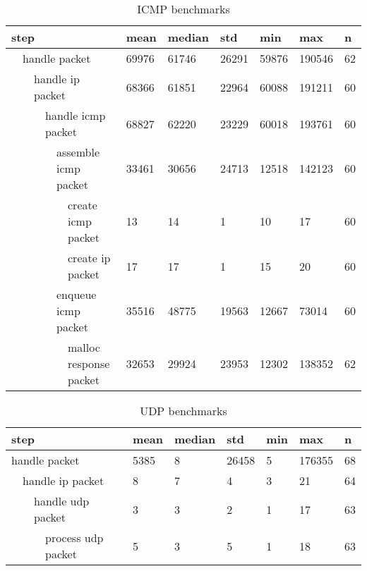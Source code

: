 \begin{table}[]
    \begin{tabular}{|llllll|l|l|l|l|l|l|}
    \hline
    \multicolumn{6}{|l|}{step} & mean & median & std & min & max & n \\ \hline
    \multicolumn{1}{|l|}{} & \multicolumn{5}{l|}{handle packet} & 69976 & 61746 & 26291 & 59876 & 190546 & 62 \\
    \multicolumn{1}{|l|}{} & \multicolumn{1}{l|}{} & \multicolumn{4}{l|}{handle ip packet} & 68366 & 61851 & 22964 & 60088 & 191211 & 60 \\
    \multicolumn{1}{|l|}{} & \multicolumn{1}{l|}{} & \multicolumn{1}{l|}{} & \multicolumn{3}{l|}{handle icmp packet} & 68827 & 62220 & 23229 & 60018 & 193761 & 60 \\
    \multicolumn{1}{|l|}{} & \multicolumn{1}{l|}{} & \multicolumn{1}{l|}{} & \multicolumn{1}{l|}{} & \multicolumn{2}{l|}{assemble icmp packet} & 33461 & 30656 & 24713 & 12518 & 142123 & 60 \\
    \multicolumn{1}{|l|}{} & \multicolumn{1}{l|}{} & \multicolumn{1}{l|}{} & \multicolumn{1}{l|}{} & \multicolumn{1}{l|}{} & create icmp packet & 13 & 14 & 1 & 10 & 17 & 60 \\
    \multicolumn{1}{|l|}{} & \multicolumn{1}{l|}{} & \multicolumn{1}{l|}{} & \multicolumn{1}{l|}{} & \multicolumn{1}{l|}{} & create ip packet & 17 & 17 & 1 & 15 & 20 & 60 \\
    \multicolumn{1}{|l|}{} & \multicolumn{1}{l|}{} & \multicolumn{1}{l|}{} & \multicolumn{1}{l|}{} & \multicolumn{2}{l|}{enqueue icmp packet} & 35516 & 48775 & 19563 & 12667 & 73014 & 60 \\
    \multicolumn{1}{|l|}{} & \multicolumn{1}{l|}{} & \multicolumn{1}{l|}{} & \multicolumn{1}{l|}{} & \multicolumn{1}{l|}{} & malloc response packet & 32653 & 29924 & 23953 & 12302 & 138352 & 62 \\
    \hline
    \end{tabular}
    \caption{ICMP benchmarks}
    \label{tab:icmp-benchmarks}
\end{table}

\begin{table}[]
    \begin{tabular}{|llll|l|l|l|l|l|l|}
    \hline
    \multicolumn{4}{|l|}{step} & mean & median & std & min & max & n \\ \hline
    \multicolumn{4}{|l|}{handle packet} & 5385 & 8 & 26458 & 5 & 176355 & 68 \\
    \multicolumn{1}{|l|}{} & \multicolumn{3}{l|}{handle ip packet} & 8 & 7 & 4 & 3 & 21 & 64 \\
    \multicolumn{1}{|l|}{} & \multicolumn{1}{l|}{} & \multicolumn{2}{l|}{handle udp packet} & 3 & 3 & 2 & 1 & 17 & 63 \\
    \multicolumn{1}{|l|}{} & \multicolumn{1}{l|}{} & \multicolumn{1}{l|}{} & process udp packet & 5 & 3 & 5 & 1 & 18 & 63 \\
    \hline
    \end{tabular}
    \caption{UDP benchmarks}
    \label{tab:udp-benchmarks}
\end{table}


